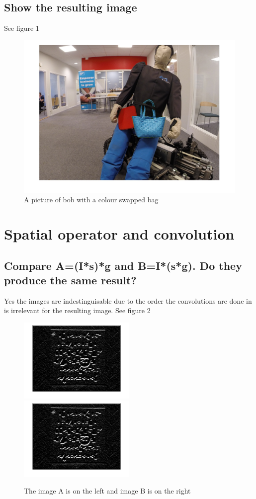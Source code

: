 \subsection{Show the resulting image}
See figure 1
\begin{figure}[h]
    \includegraphics[width=\textwidth]{./bluebag.jpg}
    \caption{A picture of bob with a colour swapped bag}
\end{figure}
\section{Spatial operator and convolution}
\subsection{Compare A=(I*s)*g and B=I*(s*g). Do they produce the same result?}
Yes the images are indestinguisable due to the order the convolutions are done in is irrelevant for the resulting image.
See figure 2
\begin{figure}[h]
    \includegraphics[width=0.5\textwidth]{./Conv((Cs)g).jpg}
    \includegraphics[width=0.5\textwidth]{./Conv(C(sg)).jpg}
    \caption{The image A is on the left and image B is on the right}
\end{figure}


